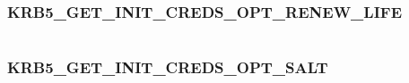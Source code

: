 \documentclass[letterpaper,10pt,english]{sphinxmanual}
\begin{document}
\begin{fulllineitems}
\label{appdev/refs/macros/KRB5_GET_INIT_CREDS_OPT_PROXIABLE:KRB5_GET_INIT_CREDS_OPT_PROXIABLE}
\end{fulllineitems}


\begin{tabulary}{\linewidth}{|L|L|}
\hline

 & 
\\
\hline\end{tabulary}



\subsubsection{KRB5\_GET\_INIT\_CREDS\_OPT\_RENEW\_LIFE}
\label{appdev/refs/macros/KRB5_GET_INIT_CREDS_OPT_RENEW_LIFE::doc}\label{appdev/refs/macros/KRB5_GET_INIT_CREDS_OPT_RENEW_LIFE:krb5-get-init-creds-opt-renew-life-data}\label{appdev/refs/macros/KRB5_GET_INIT_CREDS_OPT_RENEW_LIFE:krb5-get-init-creds-opt-renew-life}

\begin{fulllineitems}
\label{appdev/refs/macros/KRB5_GET_INIT_CREDS_OPT_RENEW_LIFE:KRB5_GET_INIT_CREDS_OPT_RENEW_LIFE}
\end{fulllineitems}


\begin{tabulary}{\linewidth}{|L|L|}
\hline

 & 
\\
\hline\end{tabulary}



\subsubsection{KRB5\_GET\_INIT\_CREDS\_OPT\_SALT}
\label{appdev/refs/macros/KRB5_GET_INIT_CREDS_OPT_SALT:krb5-get-init-creds-opt-salt-data}\label{appdev/refs/macros/KRB5_GET_INIT_CREDS_OPT_SALT:krb5-get-init-creds-opt-salt}\label{appdev/refs/macros/KRB5_GET_INIT_CREDS_OPT_SALT::doc}

\begin{fulllineitems}
\label{appdev/refs/macros/KRB5_GET_INIT_CREDS_OPT_SALT:KRB5_GET_INIT_CREDS_OPT_SALT}
\end{fulllineitems}
\end{document}
